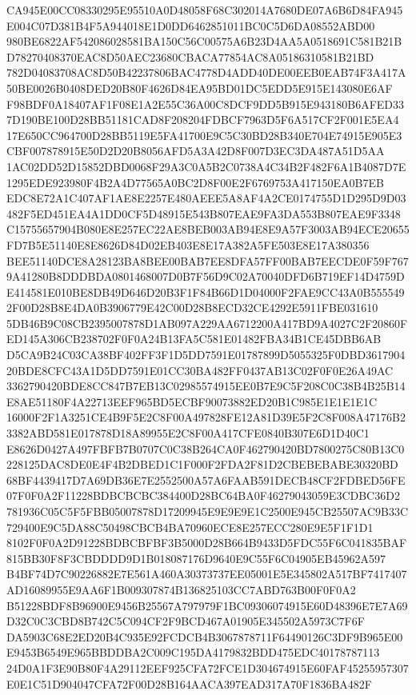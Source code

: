 \documentclass[UTF8,fontset=fandol,zihao=-4,a4paper]{ctexart}
\begin{document}
{{CA945E00CC08330295E95510A0D48058F68C302014A7680DE07A6B6D84FA945E004C07D381B4F5A944018E1D0DD6462851011BC0C5D6DA08552ABD00
980BE6822AF542086028581BA150C56C00575A6B23D4AA5A0518691C581B21BD78270408370EAC8D50AEC23680CBACA77854AC8A05186310581B21BD
782D04083708AC8D50B42237806BAC4778D4ADD40DE00EEB0EAB74F3A417A50BE0026B0408DED20B80F4626D84EA95BD01DC5EDD5E915E143080E6AF
F98BDF0A18407AF1F08E1A2E55C36A00C8DCF9DD5B915E943180B6AFED337D190BE100D28BB51181CAD8F208204FDBCF7963D5F6A517CF2F001E5EA4
17E650CC964700D28BB5119E5FA41700E9C5C30BD28B340E704E74915E905E3CBF007878915E50D2D20B8056AFD5A3A42D8F007D3EC3DA487A51D5AA
1AC02DD52D15852DBD0068F29A3C0A5B2C0738A4C34B2F482F6A1B4087D7E1295EDE923980F4B2A4D77565A0BC2D8F00E2F6769753A417150EA0B7EB
EDC8E72A1C407AF1AE8E2257E480AEEE5A8AF4A2CE0174755D1D295D9D03482F5ED451EA4A1DD0CF5D48915E543B807EAE9FA3DA553B807EAE9F3348
C15755657904B080E8E257EC22AE8BEB003AB94E8E9A57F3003AB94ECE20655FD7B5E51140E8E8626D84D02EB403E8E17A382A5FE503E8E17A380356
BEE51140DCE8A28123BA8BEE00BAB7EE8DFA57FF00BAB7EECDE0F59F7679A41280B8DDDBDA0801468007D0B7F56D9C02A70040DFD6B719EF14D4759D
E414581E010BE8DB49D646D20B3F1F84B66D1D04000F2FAE9CC43A0B5555492F00D28B8E4DA0B3906779E42C00D28B8ECD32CE4292E5911FBE031610
5DB46B9C08CB2395007878D1AB097A229AA6712200A417BD9A4027C2F20860FED145A306CB238702F0F0A24B13FA5C581E01482FBA34B1CE45DBB6AB
D5CA9B24C03CA38BF402FF3F1D5DD7591E01787899D5055325F0DBD361790420BDE8CFC43A1D5DD7591E01CC30BA482FF0437AB13C02F0F0E26A49AC
3362790420BDE8CC847B7EB13C02985574915EE0B7E9C5F208C0C38B4B25B14E8AE51180F4A22713EEF965BD5ECBF90073882ED20B1C985E1E1E1E1C
16000F2F1A3251CE4B9F5E2C8F00A497828FE12A81D39E5F2C8F008A47176B23382ABD581E017878D18A89955E2C8F00A417CFE0840B307E6D1D40C1
E8626D0427A497FBFB7B0707C0C38B264CA0F462790420BD7800275C80B13C0228125DAC8DE0E4F4B2DBED1C1F000F2FDA2F81D2CBEBEBABE30320BD
68BF4439417D7A69DB36E7E2552500A57A6FAAB591DECB48CF2FDBED56FE07F0F0A2F11228BDBCBCBC384400D28BC64BA0F46279043059E3CDBC36D2
781936C05C5F5FBB05007878D17209945E9E9E9E1C2500E945CB25507AC9B33C729400E9C5DA88C50498CBCB4BA70960ECE8E257ECC280E9E5F1F1D1
8102F0F0A2D91228BDBCBFBF3B5000D28B664B9433D5FDC55F6C041835BAF815BB30F8F3CBDDDD9D1B018087176D9640E9C55F6C04905EB45962A597
B4BF74D7C90226882E7E561A460A30373737EE05001E5E345802A517BF7417407AD16089955E9AA6F1B009307874B136825103CC7ABD763B00F0F0A2
B51228BDF8B96900E9456B25567A797979F1BC09306074915E60D48396E7E7A69D32C0C3CBD8B742C5C094CF2F9BCD467A01905E345502A5973C7F6F
DA5903C68E2ED20B4C935E92FCDCB4B3067878711F64490126C3DF9B965E00E9453B6549E965BBDDBA2C009C195DA4179832BDD475EDC40178787113
24D0A1F3E90B80F4A29112EEF925CFA72FCE1D304674915E60FAF45255957307E0E1C51D904047CFA72F00D28B164AACA397EAD317A70F1836BA482F
}}
\end{document}
